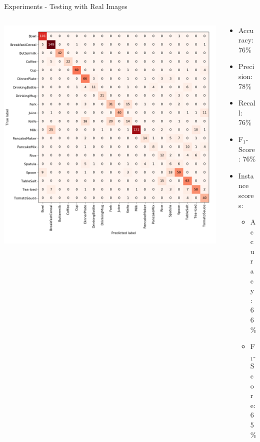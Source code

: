 \documentclass[]{beamer}
\begin{document}
\begin{frame}{Experiments - Testing with Real Images}
\begin{columns}
	\begin{column}{0.7\textwidth}
		\includegraphics[scale=.3]{../thesis/img/chapter6/UnrealRealGTClass.png}
	\end{column}
	\quad
	\begin{column}{0.3\textwidth}
		\begin{itemize}
			\item Accuracy: 76\%
			\item Precision: 78\%
			\item Recall: 76\%
			\item F$_{1}$-Score: 76\%
			\bigskip
			\item Instance scores:
			\begin{itemize}
				\item Accuracy: 66\%
				\item F$_{1}$-Score: 65\%
			\end{itemize}
		\end{itemize}
	\end{column}
\end{columns}
\end{frame}
\end{document}
